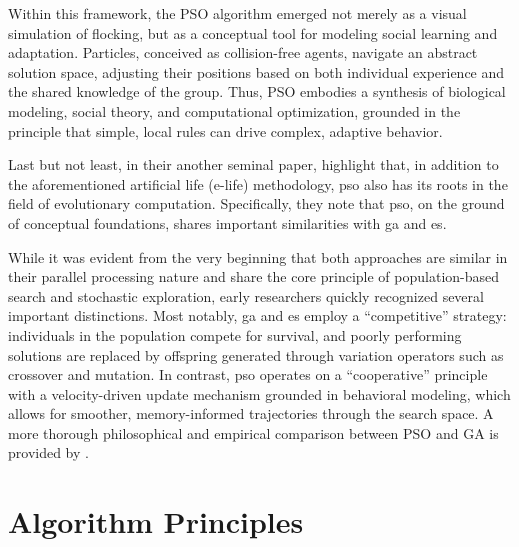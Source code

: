 {Within this framework, the PSO algorithm emerged not merely as a visual simulation of flocking, but as a conceptual tool for modeling social learning and adaptation. Particles, conceived as collision-free agents, navigate an abstract solution space, adjusting their positions based on both individual experience and the shared knowledge of the group. Thus, PSO embodies a synthesis of biological modeling, social theory, and computational optimization, grounded in the principle that simple, local rules can drive complex, adaptive behavior.

Last but not least, in their another seminal paper, \citet{eberhart1995new} highlight that, in addition to the aforementioned artificial life (e-life) methodology, \acrlong{pso} also has its roots in the field of evolutionary computation. Specifically, they note that \acrshort{pso}, on the ground of conceptual foundations, shares important similarities with \acrfull{ga} and \acrfull{es}.

While it was evident from the very beginning that both approaches are similar in their parallel processing nature and share the core principle of population-based search and stochastic exploration, early researchers quickly recognized several important distinctions. Most notably,  \acrshort{ga} and \acrshort{es} employ a ``competitive'' strategy: individuals in the population compete for survival, and poorly performing solutions are replaced by offspring generated through variation operators such as crossover and mutation. In contrast, \acrshort{pso} operates on a ``cooperative'' principle with a velocity-driven update mechanism grounded in behavioral modeling, which allows for smoother, memory-informed trajectories through the search space. A more thorough philosophical and empirical comparison between PSO and GA is provided by \citet{angeline1998evolutionary}.




\section{Algorithm Principles}








}
